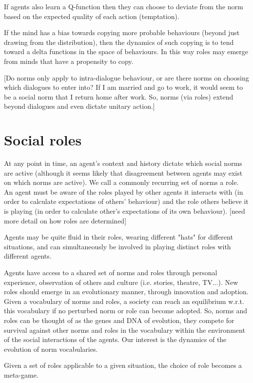 \documentclass[a4paper]{article}
\begin{document}
If agents also learn a Q-function then they can choose to deviate from the norm based on the expected quality of each action (temptation).

If the mind has a bias towards copying more probable behaviours (beyond just drawing from the distribution), then the dynamics of such copying is to tend toward a delta functions in the space of behaviours. In this way roles may emerge from minds that have a propensity to copy.

[Do norms only apply to intra-dialogue behaviour, or are there norms on choosing which dialogues to enter into? If I am married and go to work, it would seem to be a social norm that I return home after work. So, norms (via roles) extend beyond dialogues and even dictate unitary action.]

\section{Social roles}

At any point in time, an agent's context and history dictate which social norms are active (although it seems likely that disagreement between agents may exist on which norms are active). We call a commonly recurring set of norms a role. An agent must be aware of the roles played by other agents it interacts with (in order to calculate expectations of others' behaviour) and the role others believe it is playing (in order to calculate other's expectations of its own behaviour). [need more detail on how roles are determined]

Agents may be quite fluid in their roles, wearing different "hats" for different situations, and can simultaneously be involved in playing distinct roles with different agents.

Agents have access to a shared set of norms and roles through personal experience, observation of others and culture (i.e. stories, theatre, TV...). New roles should emerge in an evolutionary manner, through innovation and adoption. Given a vocabulary of norms and roles, a society can reach an equilibrium w.r.t. this vocabulary if no perturbed norm or role can become adopted. So, norms and roles can be thought of as the genes and DNA of evolution, they compete for survival against other norms and roles in the vocabulary within the environment of the social interactions of the agents. Our interest is the dynamics of the evolution of norm vocabularies.

Given a set of roles applicable to a given situation, the choice of role becomes a meta-game.
\end{document}
